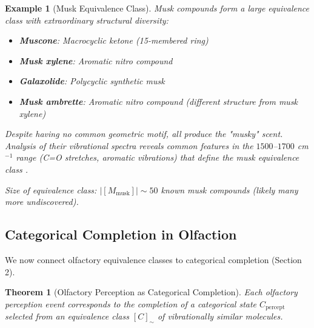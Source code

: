 \documentclass[12pt,a4paper]{article}
\newtheorem{theorem}{Theorem}
\newtheorem{example}{Example}
\begin{document}
\begin{example}[Musk Equivalence Class]
\label{ex:musk_equivalence}
Musk compounds form a large equivalence class with extraordinary structural diversity:

\begin{itemize}
\item \textbf{Muscone}: Macrocyclic ketone (15-membered ring)
\item \textbf{Musk xylene}: Aromatic nitro compound
\item \textbf{Galaxolide}: Polycyclic synthetic musk
\item \textbf{Musk ambrette}: Aromatic nitro compound (different structure from musk xylene)
\end{itemize}

Despite having no common geometric motif, all produce the "musky" scent. Analysis of their vibrational spectra reveals common features in the $1500$--$1700$ cm$^{-1}$ range (C=O stretches, aromatic vibrations) that define the musk equivalence class \cite{turin2002mechanism}.

Size of equivalence class: $|[M_{\text{musk}}]| \sim 50$ known musk compounds (likely many more undiscovered).
\end{example}

\subsection{Categorical Completion in Olfaction}

We now connect olfactory equivalence classes to categorical completion (Section 2).

\begin{theorem}[Olfactory Perception as Categorical Completion]
\label{thm:olfactory_categorical}
Each olfactory perception event corresponds to the completion of a categorical state $C_{\text{percept}}$ selected from an equivalence class $[C]_{\sim}$ of vibrationally similar molecules.
\end{theorem}
\end{document}
